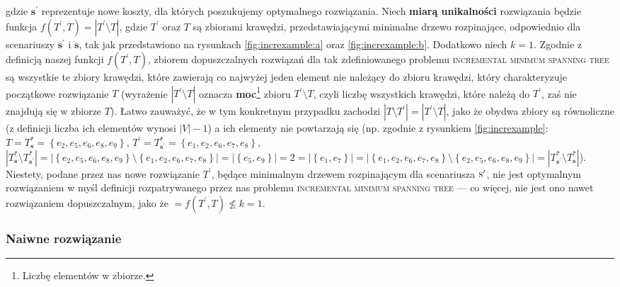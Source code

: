 gdzie $\textbf{s}^{\prime}$ reprezentuje nowe koszty, dla których poszukujemy optymalnego rozwiązania. Niech \textbf{miarą unikalności} rozwiązania będzie funkcja $f \left( T^{\prime}, T \right) = \left| T^{\prime} \setminus T \right|$, gdzie $T^{\prime}$ oraz $T$ są zbiorami krawędzi, przedstawiającymi minimalne drzewo rozpinające, odpowiednio dla scenariuszy $\textbf{s}^{\prime}$ i $\textbf{s}$, tak jak przedstawiono na rysunkach \ref{fig:increxample:a} oraz \ref{fig:increxample:b}. Dodatkowo niech $k = 1$. Zgodnie z definicją naszej funkcji $f \left( T^{\prime}, T \right)$, zbiorem dopuszczalnych rozwiązań dla tak zdefiniowanego problemu \textsc{incremental minimum spanning tree} są wszystkie te zbiory krawędzi, które zawierają co najwyżej jeden element nie należący do zbioru krawędzi, który charakteryzuje początkowe rozwiązanie $T$ (wyrażenie $\left| T^{\prime} \setminus T \right|$ oznacza \textbf{moc}\footnote{Liczbę elementów w zbiorze.} zbioru $T^{\prime} \setminus T$, czyli liczbę wszystkich krawędzi, które należą do $T^{\prime}$, zaś nie znajdują się w zbiorze $T$). Łatwo zauważyć, że w tym konkretnym przypadku zachodzi $\left| T \setminus T^{\prime} \right| = \left| T^{\prime} \setminus T \right|$, jako że obydwa zbiory są równoliczne (z definicji liczba ich elementów wynosi $\left| V \right| - 1$) a ich elementy nie powtarzają się (np. zgodnie z rysunkiem \ref{fig:increxample}: $T = T^{\ast}_{\textbf{s}} = \left\{ e_{2}, e_{5}, e_{6}, e_{8}, e_{9} \right\}$, $T^{\prime} = T^{\ast}_{\textbf{s}^{\prime}} = \left\{ e_{1}, e_{2}, e_{6}, e_{7}, e_{8} \right\}$, $\left| T^{\ast}_{\textbf{s}} \setminus T^{\ast}_{\textbf{s}^{\prime}} \right| = \left| \left\{ e_{2}, e_{5}, e_{6}, e_{8}, e_{9} \right\} \setminus \left\{ e_{1}, e_{2}, e_{6}, e_{7}, e_{8} \right\} \right| = \left| \left\{ e_{5}, e_{9} \right\} \right| = 2 = \left| \left\{ e_{1}, e_{7} \right\} \right| = \left| \left\{ e_{1}, e_{2}, e_{6}, e_{7}, e_{8} \right\} \setminus \left\{ e_{2}, e_{5}, e_{6}, e_{8}, e_{9} \right\} \right| = \left| T^{\ast}_{\textbf{s}^{\prime}} \setminus T^{\ast}_{\textbf{s}} \right|$). Niestety, podane przez nas nowe rozwiązanie $T^{\prime}$, będące minimalnym drzewem rozpinającym dla scenariusza $\textsc{s}^{\prime}$, nie jest optymalnym rozwiązaniem w myśl definicji rozpatrywanego przez nas problemu \textsc{incremental minimum spanning tree} --- co więcej, nie jest ono nawet rozwiązaniem dopuszczalnym, jako że $ = f \left( T^{\prime}, T \right) \nleqslant k = 1$.

\subsubsection{Naiwne rozwiązanie}

